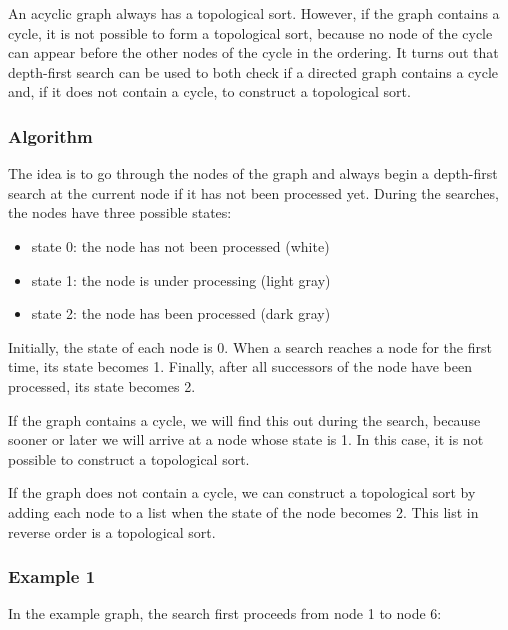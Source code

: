 An acyclic graph always has a topological sort.
However, if the graph contains a cycle,
it is not possible to form a topological sort,
because no node of the cycle can appear
before the other nodes of the cycle in the ordering.
It turns out that depth-first search can be used
to both check if a directed graph contains a cycle
and, if it does not contain a cycle, to construct a topological sort.

\subsubsection{Algorithm}

The idea is to go through the nodes of the graph
and always begin a depth-first search at the current node
if it has not been processed yet.
During the searches, the nodes have three possible states:

\begin{itemize}
\item state 0: the node has not been processed (white)
\item state 1: the node is under processing (light gray)
\item state 2: the node has been processed (dark gray)
\end{itemize}

Initially, the state of each node is 0.
When a search reaches a node for the first time,
its state becomes 1.
Finally, after all successors of the node have
been processed, its state becomes 2.

If the graph contains a cycle, we will find this out
during the search, because sooner or later
we will arrive at a node whose state is 1.
In this case, it is not possible to construct a topological sort.

If the graph does not contain a cycle, we can construct
a topological sort by 
adding each node to a list when the state of the node becomes 2.
This list in reverse order is a topological sort.

\subsubsection{Example 1}

In the example graph, the search first proceeds
from node 1 to node 6:

